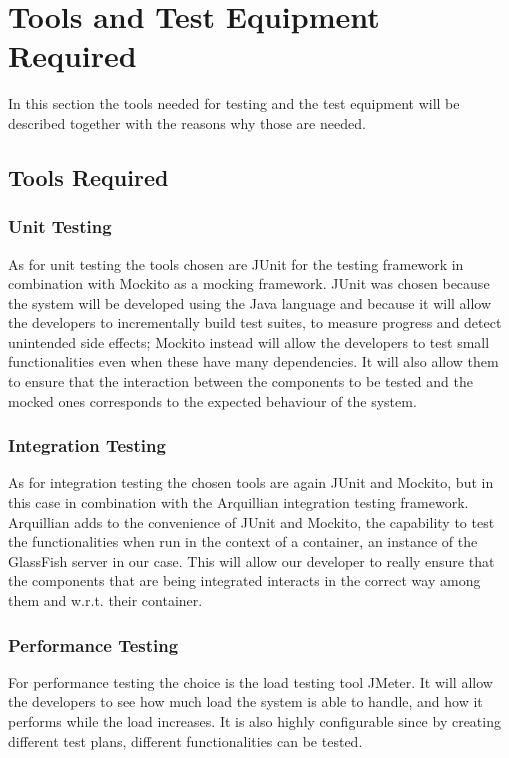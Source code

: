 \section{Tools and Test Equipment Required}

In this section the tools needed for testing and the test equipment will be described together with the reasons why those are needed.

\subsection{Tools Required}

\subsubsection{Unit Testing}
As for unit testing the tools chosen are JUnit for the testing framework in combination with Mockito as a mocking framework.
JUnit was chosen because the system will be developed using the Java language and because it will allow the developers to incrementally build test suites, to measure progress and detect unintended side effects; Mockito instead will allow the developers to test small functionalities even when these have many dependencies. It will also allow them to ensure that the interaction between the components to be tested and the mocked ones corresponds to the expected behaviour of the system.

\subsubsection{Integration Testing}
As for integration testing the chosen tools are again JUnit and Mockito, but in this case in combination with the Arquillian integration testing framework.
Arquillian adds to the convenience of JUnit and Mockito, the capability to test the functionalities when run in the context of a container, an instance of the GlassFish server in our case. This will allow our developer to really ensure that the components that are being integrated interacts in the correct way among them and w.r.t. their container.

\subsubsection{Performance Testing}
For performance testing the choice is the load testing tool JMeter. It will allow the developers to see how much load the system is able to handle, and how it performs while the load increases. It is also highly configurable since by creating different test plans, different functionalities can be tested.

